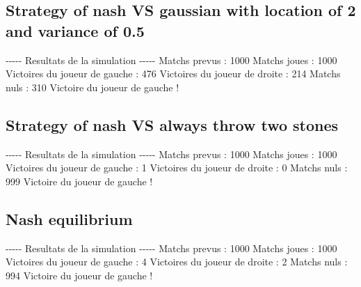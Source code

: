 \documentclass{article}%
\begin{document}
%
\subsection{Strategy of nash VS gaussian with location of 2 and variance of 0.5}%
\label{subsec:Strategy of nash VS gaussian with location of 2 and variance of 0.5}%
{-}{-}{-}{-}{-} Resultats de la simulation {-}{-}{-}{-}{-}\newline%
		\newline%
Matchs prevus : 1000\newline%
Matchs joues : 1000\newline%
\newline%
Victoires du joueur de gauche : 476\newline%
Victoires du joueur de droite : 214\newline%
Matchs nuls : 310\newline%
\newline%
Victoire du joueur de gauche !

%
\subsection{Strategy of nash VS always throw two stones}%
\label{subsec:Strategy of nash VS always throw two stones}%
{-}{-}{-}{-}{-} Resultats de la simulation {-}{-}{-}{-}{-}\newline%
		\newline%
Matchs prevus : 1000\newline%
Matchs joues : 1000\newline%
\newline%
Victoires du joueur de gauche : 1\newline%
Victoires du joueur de droite : 0\newline%
Matchs nuls : 999\newline%
\newline%
Victoire du joueur de gauche !

%
\subsection{Nash equilibrium}%
\label{subsec:Nash equilibrium}%
{-}{-}{-}{-}{-} Resultats de la simulation {-}{-}{-}{-}{-}\newline%
		\newline%
Matchs prevus : 1000\newline%
Matchs joues : 1000\newline%
\newline%
Victoires du joueur de gauche : 4\newline%
Victoires du joueur de droite : 2\newline%
Matchs nuls : 994\newline%
\newline%
Victoire du joueur de gauche !
\end{document}
